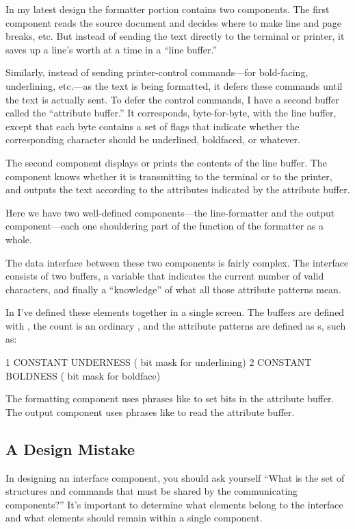 In my latest design the formatter portion contains two components.
The first component reads the source document and decides where to
make line and page breaks, etc. But instead of sending the text directly to
the terminal or printer, it saves up a line's worth at a time in a ``line
buffer.''

Similarly, instead of sending printer-control commands---for
bold-facing, underlining, etc.---as the text is being formatted, it
defers these commands until the text is actually sent. To defer the
control commands, I have a second buffer called the ``attribute
buffer.'' It corresponds, byte-for-byte, with the line buffer, except
that each byte contains a set of flags that indicate whether the
corresponding character should be underlined, boldfaced, or whatever.

The second component displays or prints the contents of the line
buffer. The component knows whether it is transmitting to the terminal
or to the printer, and outputs the text according to the attributes
indicated by the attribute buffer.

Here we have two well-defined components---the line-formatter and
the output component---each one shouldering part of the function of the
formatter as a whole.

The data interface between these two components is fairly complex.
The interface consists of two buffers, a variable that indicates the current
number of valid characters, and finally a ``knowledge'' of what all those
attribute patterns mean.

In \Forth{} I've defined these elements together in a single screen.
The buffers are defined with , the count is an ordinary
, and the attribute patterns are defined as s,
such as:
\begin{Code}
1 CONSTANT UNDERNESS ( bit mask for underlining)
2 CONSTANT BOLDNESS ( bit mask for boldface)
\end{Code}
The formatting component uses phrases like 
to set bits in the attribute buffer. The output component uses phrases
like  to read the attribute buffer.

\subsection{A Design Mistake}

In designing an interface component, you should ask yourself ``What is
the set of structures and commands that must be shared by the
communicating components?'' It's important to determine what elements
belong to the interface and what elements should remain within a
single component.

